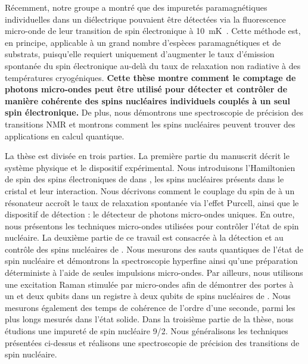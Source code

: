 Récemment, notre groupe a montré que des impuretés paramagnétiques individuelles dans un diélectrique pouvaient être détectées via la fluorescence micro-onde de leur transition de spin électronique à 10~mK~. Cette méthode est, en principe, applicable à un grand nombre d'espèces paramagnétiques et de substrats, puisqu'elle requiert uniquement d'augmenter le taux d'émission spontanée du spin électronique au-delà du taux de relaxation non radiative à des températures cryogéniques. \textbf{Cette thèse montre comment le comptage de photons micro-ondes peut être utilisé pour détecter et contrôler de manière cohérente des spins nucléaires individuels couplés à un seul spin électronique.} De plus, nous démontrons une spectroscopie de précision des transitions NMR et montrons comment les spins nucléaires peuvent trouver des applications en calcul quantique.

La thèse est divisée en trois parties. La première partie du manuscrit décrit le système physique et le dispositif expérimental. Nous introduisons l'Hamiltonien de spin des spins électroniques de \Er dans \Ca, les spins nucléaires présents dans le cristal et leur interaction. Nous décrivons comment le couplage du spin de \Er à un résonateur accroît le taux de relaxation spontanée via l'effet Purcell, ainsi que le dispositif de détection : le détecteur de photons micro-ondes uniques. En outre, nous présentons les techniques micro-ondes utilisées pour contrôler l'état de spin nucléaire. La deuxième partie de ce travail est consacrée à la détection et au contrôle des spins nucléaires de \W. Nous mesurons des sauts quantiques de l'état de spin nucléaire et démontrons la spectroscopie hyperfine ainsi qu'une préparation déterministe à l'aide de seules impulsions micro-ondes. Par ailleurs, nous utilisons une excitation Raman stimulée par micro-ondes afin de démontrer des portes à un et deux qubits dans un registre à deux qubits de spins nucléaires de \W. Nous mesurons également des temps de cohérence de l'ordre d'une seconde, parmi les plus longs mesurés dans l'état solide. Dans la troisième partie de la thèse, nous étudions une impureté \Nb de spin nucléaire 9/2. Nous généralisons les techniques présentées ci-dessus et réalisons une spectroscopie de précision des transitions de spin nucléaire.

